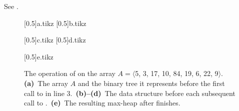 See .
\begin{figure}[htb]
    \subcaptionbox{\label{fig:6.3-1a}}[0.5\textwidth]{{a.tikz}}
    \subcaptionbox{\label{fig:6.3-1b}}[0.5\textwidth]{{b.tikz}}
    \par\vspace{1.5\vertexsize}
    \subcaptionbox{\label{fig:6.3-1c}}[0.5\textwidth]{{c.tikz}}
    \subcaptionbox{\label{fig:6.3-1d}}[0.5\textwidth]{{d.tikz}}
    \par\vspace{1.5\vertexsize}
    \subcaptionbox{\label{fig:6.3-1e}}[0.5\textwidth]{{e.tikz}}
    \caption{The operation of  on the array $A=\langle$5, 3, 17, 10, 84, 19, 6, 22, 9$\rangle$.\,
    \textbf{(a)}\, The array $A$ and the binary tree it represents before the first call to  in line 3.\,
    \textbf{(b)--(d)}\, The data structure before each subsequent call to .\,
    \textbf{(e)}\, The resulting max-heap after  finishes.} \label{fig:6.3-1}
\end{figure}
